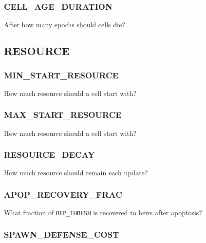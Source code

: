\subsubsection{CELL\_AGE\_DURATION}


After how many epochs should cells die?


\subsection{RESOURCE}


\subsubsection{MIN\_START\_RESOURCE}


How much resource should a cell start with?

\subsubsection{MAX\_START\_RESOURCE}


How much resource should a cell start with?

\subsubsection{RESOURCE\_DECAY}


How much resource should remain each update?

\subsubsection{APOP\_RECOVERY\_FRAC}


What fraction of \texttt{REP\_THRESH} is recovered to heirs after apoptosis?

\subsubsection{SPAWN\_DEFENSE\_COST}


